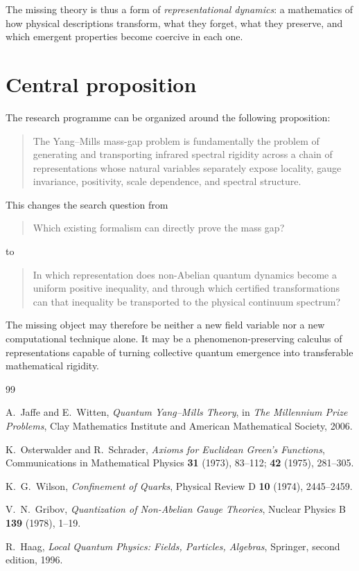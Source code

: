 \documentclass[11pt]{article}
\begin{document}
The missing theory is thus a form of \emph{representational dynamics}: a
mathematics of how physical descriptions transform, what they forget, what
they preserve, and which emergent properties become coercive in each one.

\section{Central proposition}

The research programme can be organized around the following proposition:

\begin{quote}
The Yang--Mills mass-gap problem is fundamentally the problem of generating and
transporting infrared spectral rigidity across a chain of representations whose
natural variables separately expose locality, gauge invariance, positivity,
scale dependence, and spectral structure.
\end{quote}

This changes the search question from
\begin{quote}
Which existing formalism can directly prove the mass gap?
\end{quote}
to
\begin{quote}
In which representation does non-Abelian quantum dynamics become a uniform
positive inequality, and through which certified transformations can that
inequality be transported to the physical continuum spectrum?
\end{quote}

The missing object may therefore be neither a new field variable nor a new
computational technique alone.  It may be a phenomenon-preserving calculus of
representations capable of turning collective quantum emergence into
transferable mathematical rigidity.

\begin{thebibliography}{99}

A.~Jaffe and E.~Witten,
\emph{Quantum Yang--Mills Theory},
in \emph{The Millennium Prize Problems},
Clay Mathematics Institute and American Mathematical Society, 2006.

K.~Osterwalder and R.~Schrader,
\emph{Axioms for Euclidean Green's Functions},
Communications in Mathematical Physics \textbf{31} (1973), 83--112;
\textbf{42} (1975), 281--305.

K.~G.~Wilson,
\emph{Confinement of Quarks},
Physical Review D \textbf{10} (1974), 2445--2459.

V.~N.~Gribov,
\emph{Quantization of Non-Abelian Gauge Theories},
Nuclear Physics B \textbf{139} (1978), 1--19.

R.~Haag,
\emph{Local Quantum Physics: Fields, Particles, Algebras},
Springer, second edition, 1996.

\end{thebibliography}
\end{document}
